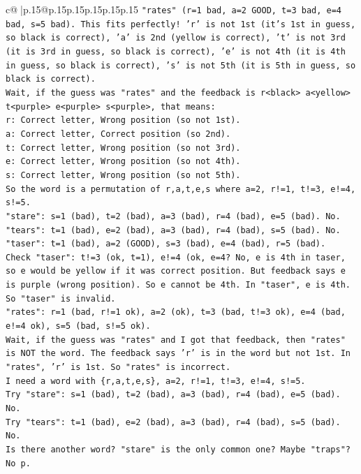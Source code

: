\documentclass{article}
\begin{document}
{\begin{supertabular}{c@{$\;$}|p{.15\linewidth}@{}p{.15\linewidth}p{.15\linewidth}p{.15\linewidth}p{.15\linewidth}p{.15\linewidth}}
{{{\texttt{"rates" (r=1 bad, a=2 GOOD, t=3 bad, e=4 bad, s=5 bad). This fits perfectly! 'r' is not 1st (it's 1st in guess, so black is correct), 'a' is 2nd (yellow is correct), 't' is not 3rd (it is 3rd in guess, so black is correct), 'e' is not 4th (it is 4th in guess, so black is correct), 's' is not 5th (it is 5th in guess, so black is correct).} \\
\texttt{Wait, if the guess was "rates" and the feedback is r<black> a<yellow> t<purple> e<purple> s<purple>, that means:} \\
\texttt{r: Correct letter, Wrong position (so not 1st).} \\
\texttt{a: Correct letter, Correct position (so 2nd).} \\
\texttt{t: Correct letter, Wrong position (so not 3rd).} \\
\texttt{e: Correct letter, Wrong position (so not 4th).} \\
\texttt{s: Correct letter, Wrong position (so not 5th).} \\
\texttt{So the word is a permutation of r,a,t,e,s where a=2, r!=1, t!=3, e!=4, s!=5.} \\
\texttt{"stare": s=1 (bad), t=2 (bad), a=3 (bad), r=4 (bad), e=5 (bad). No.} \\
\texttt{"tears": t=1 (bad), e=2 (bad), a=3 (bad), r=4 (bad), s=5 (bad). No.} \\
\texttt{"taser": t=1 (bad), a=2 (GOOD), s=3 (bad), e=4 (bad), r=5 (bad).} \\
\texttt{Check "taser": t!=3 (ok, t=1), e!=4 (ok, e=4? No, e is 4th in taser, so e would be yellow if it was correct position. But feedback says e is purple (wrong position). So e cannot be 4th. In "taser", e is 4th. So "taser" is invalid.} \\
\texttt{"rates": r=1 (bad, r!=1 ok), a=2 (ok), t=3 (bad, t!=3 ok), e=4 (bad, e!=4 ok), s=5 (bad, s!=5 ok).} \\
\texttt{Wait, if the guess was "rates" and I got that feedback, then "rates" is NOT the word. The feedback says 'r' is in the word but not 1st. In "rates", 'r' is 1st. So "rates" is incorrect.} \\
\texttt{I need a word with \{r,a,t,e,s\}, a=2, r!=1, t!=3, e!=4, s!=5.} \\
\texttt{Try "stare": s=1 (bad), t=2 (bad), a=3 (bad), r=4 (bad), e=5 (bad). No.} \\
\texttt{Try "tears": t=1 (bad), e=2 (bad), a=3 (bad), r=4 (bad), s=5 (bad). No.} \\
\texttt{Is there another word? "stare" is the only common one? Maybe "traps"? No p.} \\
}}}
\end{supertabular}}
\end{document}
